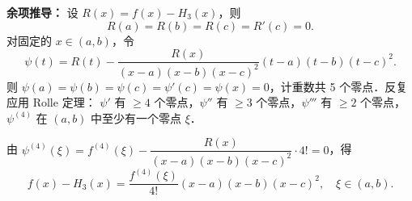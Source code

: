 \documentclass[UTF8,a4paper,11pt]{ctexart}
\begin{document}
\textbf{余项推导：} 设 $R(x)=f(x)-H_3(x)$，则
\[
  R(a) = R(b) = R(c) = R'(c) = 0.
\]
对固定的 $x \in (a,b)$，令
\[
  \psi(t) = R(t) - \frac{R(x)}{(x-a)(x-b)(x-c)^2}(t-a)(t-b)(t-c)^2.
\]
则 $\psi(a)=\psi(b)=\psi(c)=\psi'(c)=\psi(x)=0$，计重数共 5 个零点．反复应用 Rolle 定理：
$\psi'$ 有 $\geqslant 4$ 个零点，$\psi''$ 有 $\geqslant 3$ 个零点，$\psi'''$ 有 $\geqslant 2$ 个零点，
$\psi^{(4)}$ 在 $(a,b)$ 中至少有一个零点 $\xi$．

由 $\psi^{(4)}(\xi)=f^{(4)}(\xi) - \dfrac{R(x)}{(x-a)(x-b)(x-c)^2}\cdot 4! = 0$，得
\[
  \boxed{f(x) - H_3(x) = \frac{f^{(4)}(\xi)}{4!}(x-a)(x-b)(x-c)^2,
  \quad \xi \in (a,b).}
\]
\end{document}
